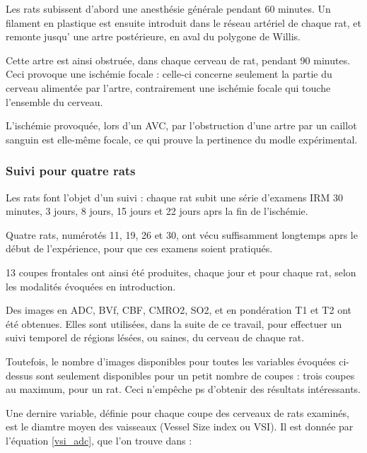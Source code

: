 \par
Les rats subissent d'abord une anesth\'esie g\'en\'erale pendant 60 minutes. %
Un filament en plastique est ensuite introduit dans le r\'eseau art\'eriel de chaque rat, %
et remonte jusqu' une artre post\'erieure, en aval du polygone de Willis.

\par
Cette artre est ainsi obstru\'ee, dans chaque cerveau de rat, pendant 90 minutes. %
Ceci provoque une isch\'emie focale : celle-ci concerne seulement la partie du cerveau aliment\'ee par l'artre, %
contrairement  une isch\'emie focale qui touche l'ensemble du cerveau.

\par
L'isch\'emie provoqu\'ee, lors d'un AVC, par l'obstruction d'une artre par un caillot sanguin est elle-m\^eme focale, %
ce qui prouve la pertinence du modle exp\'erimental.


\subsubsection{Suivi pour quatre rats}

Les rats font l'objet d'un suivi : chaque rat subit une s\'erie d'examens IRM 30 minutes, 3 jours, 8 jours, 15 jours et 22 jours aprs la fin de l'isch\'emie.

\par
Quatre rats, num\'erot\'es 11, 19, 26 et 30, ont v\'ecu suffisamment longtemps aprs le d\'ebut de l'exp\'erience, %
pour que ces examens soient pratiqu\'es.

\par
13 coupes frontales ont ainsi \'et\'e produites, chaque jour et pour chaque rat, %
selon les modalit\'es \'evoqu\'ees en introduction.

\par
Des images en ADC, BVf, CBF, CMRO2, SO2, et en pond\'eration T1 et T2 ont \'et\'e obtenues. %
Elles sont utilis\'ees, dans la suite de ce travail, pour effectuer un suivi temporel de r\'egions l\'es\'ees, ou saines, %
du cerveau de chaque rat.

\par
Toutefois, le nombre d'images disponibles pour toutes les variables \'evoqu\'ees ci-dessus sont seulement disponibles pour un petit nombre de coupes : %
trois coupes au maximum, pour un rat. Ceci n'emp\^eche ps d'obtenir des r\'esultats int\'eressants.

\etoile
Une dernire variable, d\'efinie pour chaque coupe des cerveaux de rats examin\'es, est le diamtre moyen des vaisseaux (Vessel Size index ou VSI). %
Il est donn\'ee par l'\'equation \ref{vsi_adc}, que l'on trouve dans \cite{Lem_PHD_10} :

